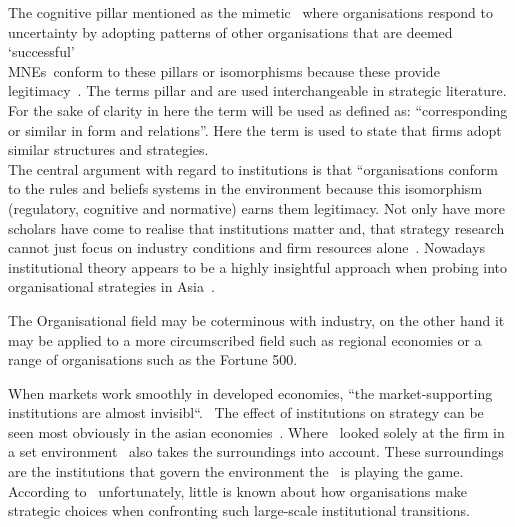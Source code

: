 The cognitive pillar mentioned as the mimetic \iso~where organisations respond to uncertainty by adopting patterns of other organisations that are deemed `successful'~\cite{Westney:2005,Peng:2008,Kostova:1999,DiMaggio:1983,Scott:1995}\\ 
\glspl{MNE}~conform to these pillars or isomorphisms because these provide legitimacy~\cite{Powell:1991}.
The terms pillar and \iso are used interchangeable in strategic literature. 
For the sake of clarity in here the term \iso will be used as defined as: ``corresponding or similar in form and relations''. Here the term is used to state that firms adopt similar structures and strategies.\\

The central argument with regard to institutions is that “organisations conform to the rules and beliefs systems in the environment because this isomorphism (regulatory, cognitive and normative) earns them legitimacy.
Not only have more scholars have come to realise that institutions matter and, that strategy research cannot just focus on industry conditions and firm resources alone~\cite{Powell:1991,Scott:1995}.
Nowadays institutional theory appears to be a highly insightful approach when probing into organisational strategies in Asia~\cite{Hoskisson:2000}.


\cite{Westney:2005} The Organisational field may be coterminous with industry, on the other hand it may be applied to a more circumscribed field such as regional economies or a range of organisations such as the Fortune 500.


 


When markets work smoothly in developed economies, ``the market-supporting institutions are almost invisibl``.~\cite{McMillan:2008}
The effect of institutions on strategy can be seen most obviously in the asian economies~\cite{Peng:2002}.
Where \rbv~looked solely at the firm in a set environment \ibv~also takes the surroundings into account. These surroundings are the institutions that govern the environment the \mne~is playing the game. \\

According to~\cite{Peng:2003} unfortunately, little is known about how organisations make strategic choices when confronting such large-scale institutional transitions.